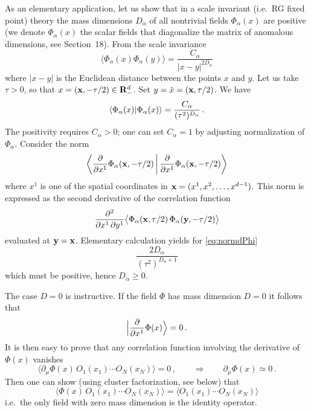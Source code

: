 As an elementary application, let us show that in a scale invariant (i.e.\ RG fixed
point) theory the mass dimensions $D_\alpha$ of all nontrivial fields
$\Phi_\alpha(x)$ are positive (we denote $\Phi_\alpha(x)$ the scalar fields that
diagonalize the matrix of anomalous dimensions, see Section~18). From the scale
invariance
\[
\bigl\langle\Phi_\alpha(x)\Phi_\alpha(y)\bigr\rangle=\frac{C_\alpha}{|x-y|^{2D_\alpha}}
\]
where $|x-y|$ is the Euclidean distance between the points $x$ and $y$. Let us take
$\tau>0$, so that $x=(\mathbf{x},-\tau/2)\in\mathbf{R}^d_-$. Set $y=\bar x=(\mathbf{x},\tau/2)$. We have
\[
\langle \Phi_\alpha(x)|\Phi_\alpha(x)\rangle=\frac{C_\alpha}{(\tau^2)^{D_\alpha}}\,.
\]
The positivity requires $C_\alpha>0$; one can set $C_\alpha=1$ by adjusting
normalization of $\Phi_\alpha$. Consider the norm
\begin{equation}\label{eq:normdPhi}
\left\langle\frac\partial{\partial x^1}\Phi_\alpha(\mathbf{x},-\tau/2)\,\middle|\,\frac\partial{\partial x^1}\Phi_\alpha(\mathbf{x},-\tau/2)\right\rangle
\end{equation}
where $x^1$ is one of the spatial coordinates in $\mathbf{x}=(x^1,x^2,\dots,x^{d-1})$. This
norm is expressed as the second derivative of the correlation function
\[
\frac{\partial^2}{\partial x^1\,\partial y^1}\bigl\langle\Phi_\alpha(\mathbf{x},\tau/2)\,\Phi_\alpha(\mathbf{y},-\tau/2)\bigr\rangle
\]
evaluated at $\mathbf{y}=\mathbf{x}$. Elementary calculation yields for \eqref{eq:normdPhi}
\[
\frac{2D_\alpha}{(\tau^2)^{D_\alpha+1}}
\]
which must be positive, hence $D_\alpha\ge0$.

The case $D=0$ is instructive. If the field $\Phi$ has mass dimension $D=0$ it
follows that
\[
\Bigl|\frac\partial{\partial x^1}\Phi(x)\Bigr\rangle=0\,.
\]
It is then easy to prove that any correlation function involving the derivative of
$\Phi(x)$ vanishes
\[
\bigl\langle\partial_\mu\Phi(x)\,O_1(x_1)\cdots O_N(x_N)\bigr\rangle=0\,,\qquad\Rightarrow\qquad\partial_\mu\Phi(x)\simeq0\,.
\]
Then one can show (using cluster factorization, see below) that
\[
\bigl\langle\Phi(x)\,O_1(x_1)\cdots O_N(x_N)\bigr\rangle=\bigl\langle O_1(x_1)\cdots O_N(x_N)\bigr\rangle
\]
i.e.\ the only field with zero mass dimension is the identity operator.
